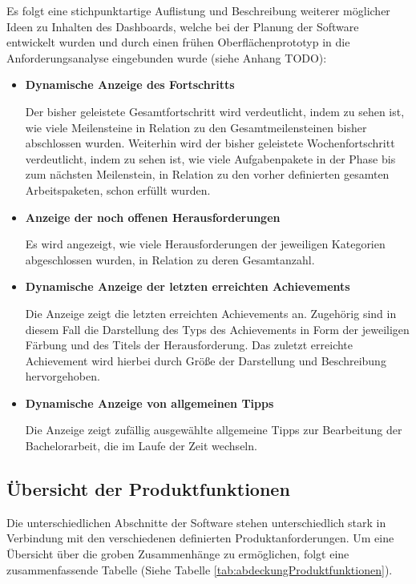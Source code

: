\documentclass[bibliography=totoc,listof=totoc,BCOR=5mm,DIV=12,oneside]{scrbook}
\begin{document}
\newpage
\par \bigskip Es folgt eine stichpunktartige Auflistung und Beschreibung weiterer möglicher Ideen zu Inhalten des Dashboards, welche bei der Planung der Software entwickelt wurden und durch einen frühen Oberflächenprototyp in die Anforderungsanalyse eingebunden wurde (siehe Anhang TODO):
\begin{itemize}
\item \textbf{Dynamische Anzeige des Fortschritts}
\par Der bisher geleistete Gesamtfortschritt wird verdeutlicht, indem zu sehen ist, wie viele Meilensteine in Relation zu den Gesamtmeilensteinen bisher abschlossen wurden. Weiterhin wird der bisher geleistete Wochenfortschritt verdeutlicht, indem zu sehen ist, wie viele Aufgabenpakete in der Phase bis zum nächsten Meilenstein, in Relation zu den vorher definierten gesamten Arbeitspaketen, schon erfüllt wurden.
\item \textbf{Anzeige der noch offenen Herausforderungen}
\par Es wird angezeigt, wie viele Herausforderungen der jeweiligen Kategorien abgeschlossen wurden, in Relation zu deren Gesamtanzahl.
\item \textbf{Dynamische Anzeige der letzten erreichten Achievements}
\par Die Anzeige zeigt die letzten erreichten Achievements an. Zugehörig sind in diesem Fall die Darstellung des Typs des Achievements in Form der jeweiligen Färbung und des Titels der Herausforderung. Das zuletzt erreichte Achievement wird hierbei durch Größe der Darstellung und Beschreibung hervorgehoben.
\item \textbf{Dynamische Anzeige von allgemeinen Tipps}
\par Die Anzeige zeigt zufällig ausgewählte allgemeine Tipps zur Bearbeitung der Bachelorarbeit, die im Laufe der Zeit wechseln. 
\end{itemize}

\newpage
\subsection{Übersicht der Produktfunktionen}
\par Die unterschiedlichen Abschnitte der Software stehen unterschiedlich stark in Verbindung mit den verschiedenen definierten Produktanforderungen. Um eine Übersicht über die groben Zusammenhänge zu ermöglichen, folgt eine zusammenfassende Tabelle (Siehe Tabelle \ref{tab:abdeckungProduktfunktionen}).
\bigskip
\end{document}
